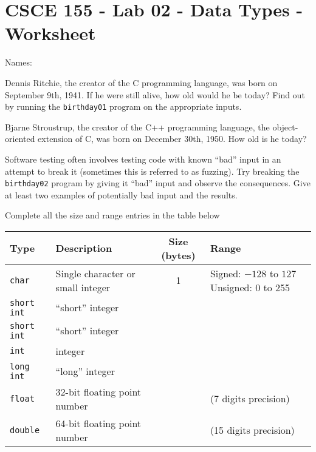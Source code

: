 \documentclass[12pt]{exam}
\begin{document}
\section*{CSCE 155 - Lab 02 - Data Types - Worksheet}

Names: \underline{\hspace{10cm}}

\begin{questions}

\question Dennis Ritchie, the creator of the C programming language, 
was born on September 9th, 1941.  If he were still alive, how old 
would he be today?  Find out by running the \texttt{birthday01} 
program on the appropriate inputs.

\begin{solution}[1cm]
\end{solution}

\question Bjarne Stroustrup, the creator of the C++ programming 
language, the object-oriented extension of C, was born on December 
30th, 1950.  How old is he today? 

\begin{solution}[1cm]
\end{solution}

\question Software testing often involves testing code with known 
``bad'' input in an attempt to break it (sometimes this is referred
to as fuzzing).  Try breaking the \texttt{birthday02} 
program by giving it ``bad'' input and observe the consequences.  
Give at least two examples of potentially bad input and the results.

\begin{solution}[1cm]
\end{solution}

\question Complete all the size and range entries in the table below
\begin{table}[h]
\centering
\begin{tabular}{|l|l|c|p{4cm}|}
\hline
Type & Description & Size (bytes) & Range \\
\hline\hline
\texttt{char} & Single character or small integer & 1 & 
 Signed: $-128$ to $127$
 Unsigned: 0 to 255 \\
\hline
\texttt{short int} & ``short'' integer & ~ &  \vspace{1cm}\\
\hline
\texttt{short int} & ``short'' integer & ~ &  \vspace{1cm}\\
\hline
\texttt{int} & integer & ~ &  \vspace{1cm}\\
\hline
\texttt{long int} & ``long'' integer & ~ &  \vspace{1cm}\\
\hline
\texttt{float} & 32-bit floating point number & ~ & (7 digits precision)\\
\hline
\texttt{double} & 64-bit floating point number & ~ & (15 digits precision)\\
\hline
\end{tabular}
\end{table}


\end{questions}
\end{document}
